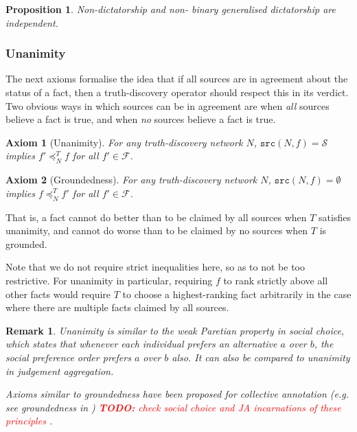 \documentclass{article}
\theoremstyle{definition} \newtheorem{definition}{Definition}
\theoremstyle{definition} \newtheorem{example}{Example}
\theoremstyle{plain} \newtheorem{axiom}{Axiom}
\theoremstyle{plain} \newtheorem*{remark}{Remark}
\theoremstyle{remark} \newtheorem*{notation}{Notation}
\theoremstyle{plain} \newtheorem{lemma}{Lemma}
\theoremstyle{plain} \newtheorem{theorem}{Theorem}
\theoremstyle{plain} \newtheorem{proposition}{Proposition}
\newcommand{\todo}[1] {
    \textcolor{red}{
        \textbf{TODO:} #1
    }
}
\renewcommand{\S}{\mathcal{S}}  %
\newcommand{\F}{\mathcal{F}}
\newcommand{\fle}{\preceq}
\newcommand{\src}{\texttt{src}}
\begin{document}
\begin{proposition}
\label{prop:non_dict_and_non_bin_gen_dict_indep}
Non-dictatorship and non- binary generalised dictatorship are independent.
\end{proposition}

\subsubsection{Unanimity}

The next axioms formalise the idea that if all sources are in agreement about
the status of a fact, then a truth-discovery operator should respect this in
its verdict. Two obvious ways in which sources can be in agreement are when
\emph{all} sources believe a fact is true, and when \emph{no} sources believe a
fact is true.

\begin{axiom}[Unanimity]
\label{axiom:unanimity}
For any truth-discovery network $N$, $\src(N, f) = \S$ implies $f' \fle_N^T f$
for all $f' \in \F$.
\end{axiom}

\begin{axiom}[Groundedness]
\label{axiom:groundedness}
For any truth-discovery network $N$, $\src(N, f) = \emptyset$ implies $f
\fle_N^T f'$ for all $f' \in \F$.
\end{axiom}

That is, a fact cannot do better than to be claimed by all sources when $T$
satisfies unanimity, and cannot do worse than to be claimed by no sources when
$T$ is grounded.

Note that we do not require strict inequalities here, so as to not be too
restrictive. For unanimity in particular, requiring $f$ to rank strictly above
all other facts would require $T$ to choose a highest-ranking fact arbitrarily
in the case where there are multiple facts claimed by all sources.

\begin{remark}
Unanimity is similar to the \emph{weak Paretian} property\cite{handbook_intro}
in social choice, which states that whenever each individual prefers an
alternative $a$ over $b$, the social preference order prefers $a$ over $b$
also. It can also be compared to unanimity in judgement
aggregation\cite{handbook_ja}.

Axioms similar to groundedness have been proposed for collective annotation
(e.g. see \emph{groundedness} in \cite{kruger}) \todo{check social choice and
JA incarnations of these principles}.
\end{remark}
\end{document}
